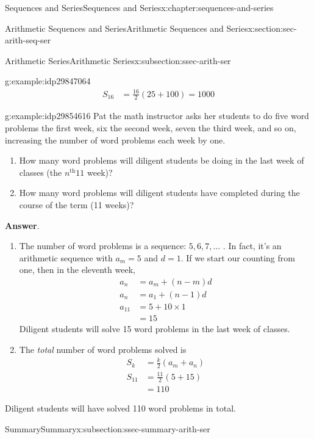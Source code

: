 \documentclass[twoside,10pt,]{book}
\newcommand{\blocktitlefont}{\relax}
\numberwithin{equation}{section}
\newcommand{\nth}{{n^{\text{th}}}}
\newcommand{\amp}{&}
\begin{document}
\begin{chapterptx}{Sequences and Series}{}{Sequences and Series}{}{}{x:chapter:sequences-and-series}
\begin{sectionptx}{Arithmetic Sequences and Series}{}{Arithmetic Sequences and Series}{}{}{x:section:sec-arith-seq-ser}
\begin{subsectionptx}{Arithmetic Series}{}{Arithmetic Series}{}{}{x:subsection:ssec-arith-ser}
\begin{example}{}{g:example:idp29847064}
\begin{align*}
S_{16} \amp = \frac{16}{2}\left(25 + 100 \right) = 1000
\end{align*}
%
\end{example}
 \begin{example}{}{g:example:idp29854616}%
Pat the math instructor asks her students to do five word problems the first week, six the second week, seven the third week, and so on, increasing the number of word problems each week by one. %
\begin{enumerate}[label=(\alph*)]
\item{}How many word problems will diligent students be doing in the last week of classes (the \(\nth{11}\) week)?%
\item{}How many word problems will diligent students have completed during the course of the term (11 weeks)?%
\end{enumerate}
\par\smallskip%
\noindent\textbf{\blocktitlefont Answer}.\label{g:answer:idp29854872}{}\hypertarget{g:answer:idp29854872}{}\quad{}%
\begin{enumerate}[label=(\alph*)]
\item{}The number of word problems is a sequence:  \(5, 6, 7, \ldots\) .  In fact, it's an arithmetic sequence with \(a_m = 5\) and \(d = 1\).  If we start our counting from one, then in the eleventh week,%
\begin{align*}
a_n \amp = a_m + \left(n - m \right)d\\
a_n \amp = a_1+\left(n-1\right)d\\
a_{11} \amp = 5+10\times 1\\
\amp = 15
\end{align*}
Diligent students will solve 15 word problems in the last week of classes.%
\item{}The \emph{total} number of word problems solved is%
\begin{align*}
S_k \amp = \frac{k}{2}\left(a_m + a_n \right)\\
S_{11} \amp = \frac{11}{2}\left(5 + 15\right)\\
\amp = 110
\end{align*}
%
\end{enumerate}
 Diligent students will have solved 110 word problems in total.\end{example}
%
\end{subsectionptx}
%
%
\typeout{************************************************}
\typeout{************************************************}
%
\begin{subsectionptx}{Summary}{}{Summary}{}{}{x:subsection:ssec-summary-arith-ser}

\end{subsectionptx}
\end{sectionptx}
\end{chapterptx}
\end{document}
